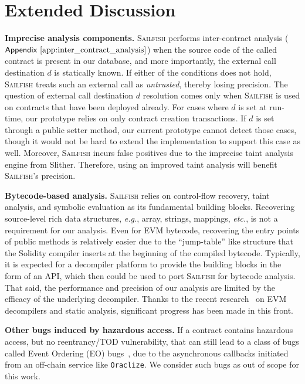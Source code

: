 \documentclass[conference, romanappendices]{tex/IEEEtran}
\theoremstyle{bfnote}
\newcommand{\toolname}{\textsc{Sailfish}\xspace}
\newcommand{\slither}{{\sc Slither}\xspace}
\newcommand{\solidity}{{\sc Solidity}\xspace}
\newcommand{\haz}{{hazardous access}\xspace}
\newcommand{\etc}{\textit{etc.}}
\newcommand{\eg}{\textit{e.g.}}
\newcommand{\Appen}[1]{\ensuremath{\sf Appendix~\ref{#1}}}
\begin{document}
\section{Extended Discussion}
\label{app:discussion}

\noindent
\textbf{Imprecise analysis components.}
\toolname{} performs inter-contract analysis (\Appen{app:inter_contract_analysis}) when the source code of the called contract is present in our database, and more importantly, the external call destination $d$ is statically known.
If either of the conditions does not hold, \toolname treats such an external call as \textit{untrusted}, thereby losing precision.
The question of external call destination $d$ resolution comes only when \toolname is used on contracts that have been deployed already.
For cases where $d$ is set at run-time, our prototype relies on only contract creation transactions.
If $d$ is set through a public setter method, our current prototype cannot detect those cases, though it would not be hard to extend the implementation to support this case as well.
Moreover, \toolname incurs false positives due to the imprecise taint analysis engine from \slither.
Therefore, using an improved taint analysis will benefit \toolname's precision.

\noindent
\textbf{Bytecode-based analysis.}
\toolname relies on control-flow recovery, taint analysis, and symbolic evaluation as its fundamental building blocks.
Recovering source-level rich data structures, \eg, array, strings, mappings, \etc, is not a requirement for our analysis.
Even for EVM bytecode, recovering the entry points of public methods is relatively easier due to the ``jump-table'' like structure that the \solidity compiler inserts at the beginning of the compiled bytecode.
Typically, it is expected for a decompiler platform to provide the building blocks in the form of an API, which then could be used to port \toolname for bytecode analysis.
That said, the performance and precision of our analysis are limited by the efficacy of the underlying decompiler.
Thanks to the recent research~\cite{rattle-repo,gigahorse,panoramix-repo,Lagouvardos20} on EVM decompilers and static analysis, significant progress has been made in this front.

\noindent
\textbf{Other bugs induced by \haz.}
If a contract contains hazardous access, but no reentrancy/TOD vulnerability, that can still lead to a class of bugs called Event Ordering (EO) bugs~\cite{ethracer}, due to the asynchronous callbacks initiated from an off-chain service like \texttt{Oraclize}.
We consider such bugs as out of scope for this work.
\end{document}

